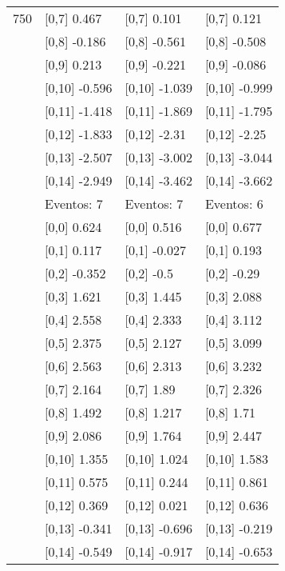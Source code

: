 \begin{table}
\begin{tabular}[t]{llll}
750 & {}[0,7] 0.467 & {}[0,7] 0.101 & {}[0,7] 0.121\\
\addlinespace
 & {}[0,8] -0.186 & {}[0,8] -0.561 & {}[0,8] -0.508\\
 & {}[0,9] 0.213 & {}[0,9] -0.221 & {}[0,9] -0.086\\
 & {}[0,10] -0.596 & {}[0,10] -1.039 & {}[0,10] -0.999\\
 & {}[0,11] -1.418 & {}[0,11] -1.869 & {}[0,11] -1.795\\
 & {}[0,12] -1.833 & {}[0,12] -2.31 & {}[0,12] -2.25\\
\addlinespace
 & {}[0,13] -2.507 & {}[0,13] -3.002 & {}[0,13] -3.044\\
 & {}[0,14] -2.949 & {}[0,14] -3.462 & {}[0,14] -3.662\\
 & Eventos:  7 & Eventos:  7 & Eventos:  6\\
 & {}[0,0] 0.624 & {}[0,0] 0.516 & {}[0,0] 0.677\\
 & {}[0,1] 0.117 & {}[0,1] -0.027 & {}[0,1] 0.193\\
\addlinespace
 & {}[0,2] -0.352 & {}[0,2] -0.5 & {}[0,2] -0.29\\
 & {}[0,3] 1.621 & {}[0,3] 1.445 & {}[0,3] 2.088\\
 & {}[0,4] 2.558 & {}[0,4] 2.333 & {}[0,4] 3.112\\
 & {}[0,5] 2.375 & {}[0,5] 2.127 & {}[0,5] 3.099\\
 & {}[0,6] 2.563 & {}[0,6] 2.313 & {}[0,6] 3.232\\
\addlinespace
1000 & {}[0,7] 2.164 & {}[0,7] 1.89 & {}[0,7] 2.326\\
 & {}[0,8] 1.492 & {}[0,8] 1.217 & {}[0,8] 1.71\\
 & {}[0,9] 2.086 & {}[0,9] 1.764 & {}[0,9] 2.447\\
 & {}[0,10] 1.355 & {}[0,10] 1.024 & {}[0,10] 1.583\\
 & {}[0,11] 0.575 & {}[0,11] 0.244 & {}[0,11] 0.861\\
\addlinespace
 & {}[0,12] 0.369 & {}[0,12] 0.021 & {}[0,12] 0.636\\
 & {}[0,13] -0.341 & {}[0,13] -0.696 & {}[0,13] -0.219\\
 & {}[0,14] -0.549 & {}[0,14] -0.917 & {}[0,14] -0.653\\
\bottomrule
\end{tabular}
\end{table}
